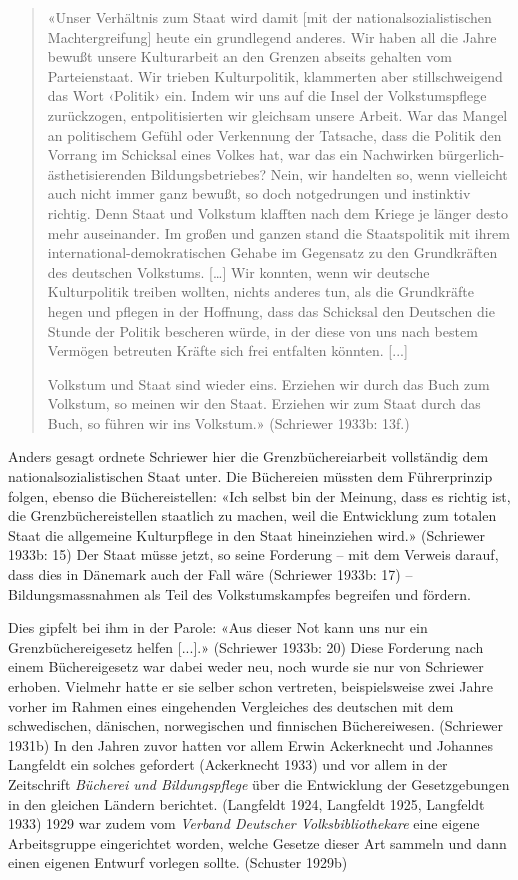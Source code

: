 \documentclass[a4paper,
fontsize=11pt,
oneside,
numbers=noperiodatend,
parskip=half-,
bibliography=totoc,
final
]{scrartcl}
\begin{document}
\begin{quote}
«Unser Verhältnis zum Staat wird damit {[}mit der
nationalsozialistischen Machtergreifung{]} heute ein grundlegend
anderes. Wir haben all die Jahre bewußt unsere Kulturarbeit an den
Grenzen abseits gehalten vom Parteienstaat. Wir trieben Kulturpolitik,
klammerten aber stillschweigend das Wort ‹Politik› ein. Indem wir uns
auf die Insel der Volkstumspflege zurückzogen, entpolitisierten wir
gleichsam unsere Arbeit. War das Mangel an politischem Gefühl oder
Verkennung der Tatsache, dass die Politik den Vorrang im Schicksal eines
Volkes hat, war das ein Nachwirken bürgerlich-ästhetisierenden
Bildungsbetriebes? Nein, wir handelten so, wenn vielleicht auch nicht
immer ganz bewußt, so doch notgedrungen und instinktiv richtig. Denn
Staat und Volkstum klafften nach dem Kriege je länger desto mehr
auseinander. Im großen und ganzen stand die Staatspolitik mit ihrem
international-demokratischen Gehabe im Gegensatz zu den Grundkräften des
deutschen Volkstums. {[}\ldots{]} Wir konnten, wenn wir deutsche
Kulturpolitik treiben wollten, nichts anderes tun, als die Grundkräfte
hegen und pflegen in der Hoffnung, dass das Schicksal den Deutschen die
Stunde der Politik bescheren würde, in der diese von uns nach bestem
Vermögen betreuten Kräfte sich frei entfalten könnten. {[}...{]}

Volkstum und Staat sind wieder eins. Erziehen wir durch das Buch zum
Volkstum, so meinen wir den Staat. Erziehen wir zum Staat durch das
Buch, so führen wir ins Volkstum.» (Schriewer 1933b: 13f.)
\end{quote}

Anders gesagt ordnete Schriewer hier die Grenzbüchereiarbeit vollständig
dem nationalsozialistischen Staat unter. Die Büchereien müssten dem
Führerprinzip folgen, ebenso die Büchereistellen: «Ich selbst bin der
Meinung, dass es richtig ist, die Grenzbüchereistellen staatlich zu
machen, weil die Entwicklung zum totalen Staat die allgemeine
Kulturpflege in den Staat hineinziehen wird.» (Schriewer 1933b: 15) Der
Staat müsse jetzt, so seine Forderung -- mit dem Verweis darauf, dass
dies in Dänemark auch der Fall wäre (Schriewer 1933b: 17) --
Bildungsmassnahmen als Teil des Volkstumskampfes begreifen und fördern.

Dies gipfelt bei ihm in der Parole: «Aus dieser Not kann uns nur ein
Grenzbüchereigesetz helfen {[}...{]}.» (Schriewer 1933b: 20) Diese
Forderung nach einem Büchereigesetz war dabei weder neu, noch wurde sie
nur von Schriewer erhoben. Vielmehr hatte er sie selber schon vertreten,
beispielsweise zwei Jahre vorher im Rahmen eines eingehenden Vergleiches
des deutschen mit dem schwedischen, dänischen, norwegischen und
finnischen Büchereiwesen. (Schriewer 1931b) In den Jahren zuvor hatten
vor allem Erwin Ackerknecht und Johannes Langfeldt ein solches gefordert
(Ackerknecht 1933) und vor allem in der Zeitschrift \emph{Bücherei und
Bildungspflege} über die Entwicklung der Gesetzgebungen in den gleichen
Ländern berichtet. (Langfeldt 1924, Langfeldt 1925, Langfeldt 1933) 1929
war zudem vom \emph{Verband Deutscher Volksbibliothekare} eine eigene
Arbeitsgruppe eingerichtet worden, welche Gesetze dieser Art sammeln und
dann einen eigenen Entwurf vorlegen sollte. (Schuster 1929b)
\end{document}

